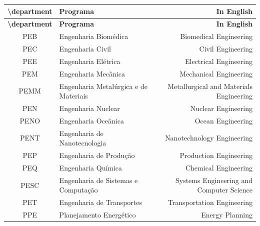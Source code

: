 \documentclass[a4paper,10pt]{article}
\begin{document}
\begin{longtable}{@{}CTD@{}}
\toprule
\normalfont\bfseries \textbackslash department & \normalfont\bfseries Programa
& \normalfont\bfseries In English \\
\midrule
\endfirsthead
\toprule
\normalfont\bfseries \textbackslash department & \normalfont\bfseries Programa
& \normalfont\bfseries In English \\
\midrule
\endhead
\bottomrule
\endfoot
PEB  & Engenharia Biomédica & Biomedical Engineering \\
PEC  & Engenharia Civil & Civil Engineering \\
PEE  & Engenharia Elétrica & Electrical Engineering \\
PEM  & Engenharia Mecânica & Mechanical Engineering \\
PEMM & Engenharia Metalúrgica e de Materiais & Metallurgical and Materials Engineering \\
PEN  & Engenharia Nuclear & Nuclear Engineering \\
PENO & Engenharia Oceânica & Ocean Engineering \\
PENT & Engenharia de Nanotecnologia & Nanotechnology Engineering \\
PEP  & Engenharia de Produção & Production Engineering \\
PEQ  & Engenharia Química & Chemical Engineering \\
PESC & Engenharia de Sistemas e Computação & Systems Engineering and Computer Science \\
PET  & Engenharia de Transportes & Transportation Engineering \\
PPE  & Planejamento Energético & Energy Planning \\
\end{longtable}
\end{document}
